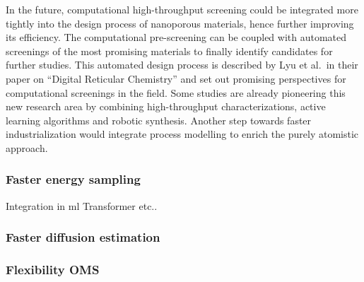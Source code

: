 \documentclass[main.tex]{subfiles}
\begin{document}
In the future, computational high-throughput screening could be integrated more tightly into the design process of nanoporous materials, hence further improving its efficiency. The computational pre-screening can be coupled with automated screenings of the most promising materials to finally identify candidates for further studies. This automated design process is described by Lyu et al.\ in their paper on ``Digital Reticular Chemistry'' and set out promising perspectives for computational screenings in the field.\cite{Lyu_2020} {Some studies are already pioneering this new research area by combining high-throughput characterizations, active learning algorithms and robotic synthesis.\cite{Greenaway_2018,Moosavi_2019} Another step towards faster industrialization would integrate process modelling to enrich the purely atomistic approach.}

\subsubsection{Faster energy sampling}

Integration in ml
Transformer etc.. 

\subsubsection{Faster diffusion estimation}


\subsubsection{Flexibility OMS}

\OnlyInSubfile{\printglobalbibliography}
\end{document}
